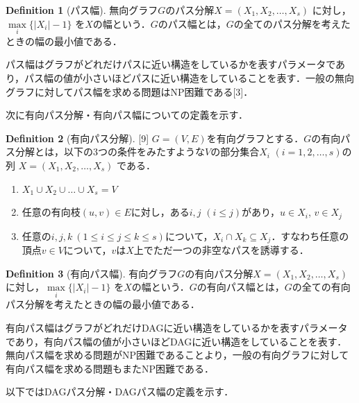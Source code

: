 \documentclass[master]{kuisthesis}		%
\theoremstyle{plain}
\theoremstyle{definition}
\newtheorem{definition*}{Definition}
\begin{document}
\begin{definition*}[パス幅]
    無向グラフ$G$のパス分解$X=(X_1, X_2,   \dots, X_s)$ に対し，$ \underset{i}{\max} \{ |X_i|-1 \}$ を$X$の幅という．$G$のパス幅とは，$G$の全てのパス分解を考えたときの幅の最小値である．
\end{definition*}

パス幅はグラフがどれだけパスに近い構造をしているかを表すパラメータであり，パス幅の値が小さいほどパスに近い構造をしていることを表す．一般の無向グラフに対してパス幅を求める問題はNP困難である[3]．


 
次に有向パス分解・有向パス幅についての定義を示す．

\begin{definition*}[有向パス分解][9]
    $G=(V, E)$を有向グラフとする．$G$の有向パス分解とは，以下の3つの条件をみたすような$V$の部分集合$X_i$ $(i = 1, 2,  \dots, s)$の列 $X=(X_1, X_2,  \dots, X_s)$ である．
    
    \begin{enumerate}
        \item $ X_1 \cup X_2 \cup \dots \cup X_s = V $ 
        \item 任意の有向枝$(u, v) \in E$に対し，ある$i, j$ $(i \leq j)$があり，$u \in X_i$, $v \in X_j$
        \item 任意の$ i, j, k\ (1 \leq i \leq j \leq k \leq s)$について，$X_i \cap X_k \subseteq X_j$．すなわち任意の頂点$v \in V$について，$v$は$X$上でただ一つの非空なパスを誘導する．
    \end{enumerate}
\end{definition*}


\begin{definition*}[有向パス幅]
    有向グラフ$G$の有向パス分解$X=(X_1, X_2,   \dots, X_s)$に対し，$ \underset{i}{\max} \{ |X_i|-1 \}$ を$X$の幅という．$G$の有向パス幅とは，$G$の全ての有向パス分解を考えたときの幅の最小値である．
\end{definition*}

有向パス幅はグラフがどれだけDAGに近い構造をしているかを表すパラメータであり，有向パス幅の値が小さいほどDAGに近い構造をしていることを表す．無向パス幅を求める問題がNP困難であることより，一般の有向グラフに対して有向パス幅を求める問題もまたNP困難である．






以下ではDAGパス分解・DAGパス幅の定義を示す．
\end{document}
